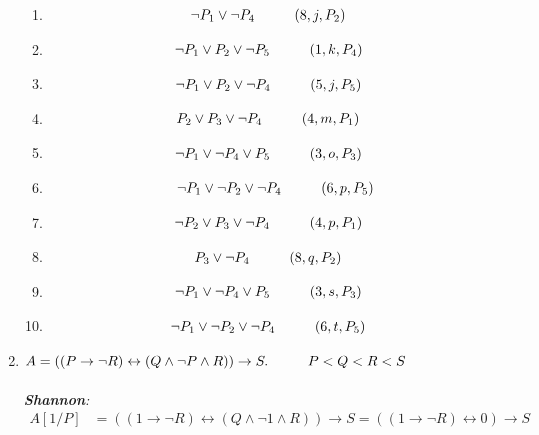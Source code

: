 \documentclass[a4paper,12pt, centered]{article}
\newcommand\tab[1][1cm]{\hspace*{#1}}
\begin{document}
\begin{enumerate}
\begin{multicols}{2}
\begin{enumerate}
			\item \begin{align*}
				\neg P_1\lor\neg P_4\tab & (8,j,P_2)
			\end{align*}
			\item \begin{align*}
				\neg P_1\lor P_2\lor\neg P_5\tab & (1,k,P_4)
			\end{align*}
			\item \begin{align*}
				\neg P_1\lor P_2\lor\neg P_4\tab & (5, j,P_5)
			\end{align*}
			\item \begin{align*}
				P_2\lor P_3\lor\neg P_4\tab & (4,m,P_1)
			\end{align*}
			\item \begin{align*}
				\neg P_1\lor\neg P_4\lor P_5\tab & (3, o,P_3)
			\end{align*}
			\item \begin{align*}
				\neg P_1\lor\neg P_2\lor\neg P_4\tab (6,p,P_5)
			\end{align*}
			\item \begin{align*}
				\neg P_2\lor P_3\lor\neg P_4\tab & (4,p,P_1)
			\end{align*}
			\item \begin{align*}
				P_3\lor\neg P_4\tab & (8,q,P_2)
			\end{align*}
			\item \begin{align*}
				\neg P_1\lor\neg P_4\lor P_5\tab & (3,s,P_3) 
			\end{align*}
			\item \begin{align*}
				\neg P_1\lor\neg P_2\lor\neg P_4\tab & (6,t,P_5) 
			\end{align*}
		\end{enumerate}
	\end{multicols}
	\item $A=((P\to\neg R)\leftrightarrow(Q\land\neg P\land R))\to S.\tab P<Q<R<S$\\\\\emph{\textbf{Shannon}:}\\\begin{align*}
		A[1/P]&=((1\to\neg R)\leftrightarrow(Q\land\neg 1\land R))\to S=((1\to\neg R)\leftrightarrow0)\to S\\

\end{align*}
\end{enumerate}
\end{document}
